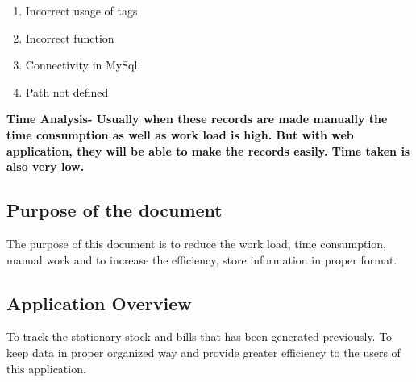 \documentclass[12pt]{report}
\renewcommand{\_}{\kern-1.5pt\textunderscore\kern-1.5pt}
\begin{document}
\begin{enumerate}
	\item \textcolor[HTML]{0D0D0D}{Incorrect usage of tags}\par

	\item \textcolor[HTML]{0D0D0D}{Incorrect function}\par

	\item \textcolor[HTML]{0D0D0D}{Connectivity in MySql.}\par

	\item \textcolor[HTML]{0D0D0D}{Path not defined}
\end{enumerate}\par


\vspace{\baselineskip}
\begin{adjustwidth}{0.3in}{0.84in}
\textbf{\textcolor[HTML]{0D0D0D}{Time Analysis- Usually when these records are made manually the time consumption as well as work load is high. But with web application, they will be able to make the records easily. Time taken is also very low.}}\par

\end{adjustwidth}


\vspace{\baselineskip}
\subsection{Purpose of the document}

\vspace{\baselineskip}
\begin{adjustwidth}{0.3in}{0.84in}
\textcolor[HTML]{0D0D0D}{The purpose of this document is to reduce the work load, time consumption, manual work and to increase the efficiency, store information in proper format.}\par

\end{adjustwidth}


\vspace{\baselineskip}
\subsection{Application Overview}

\vspace{\baselineskip}
\begin{adjustwidth}{0.3in}{0.84in}
\textcolor[HTML]{0D0D0D}{To track the stationary stock and bills that has been generated previously. To keep data in proper organized way and provide greater efficiency to the users of this application.}\par

\end{adjustwidth}
\end{document}
